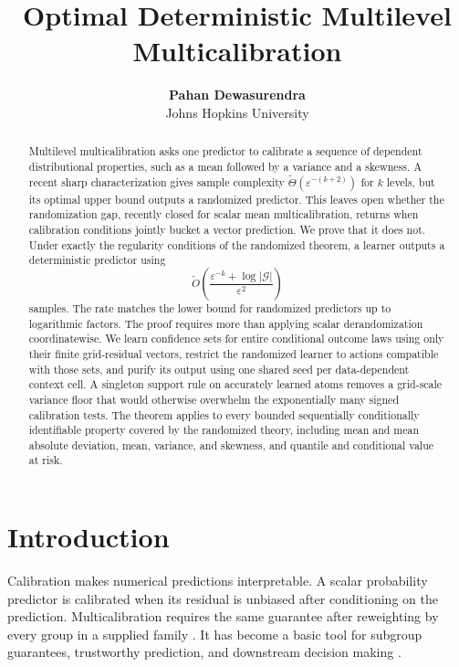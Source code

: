 \documentclass{article}
\title{Optimal Deterministic Multilevel Multicalibration}
\author{\textbf{Pahan Dewasurendra} \\ Johns Hopkins University}
\theoremstyle{definition}
\theoremstyle{remark}
\newcommand{\1}{\mathbf 1}
\begin{document}
\maketitle

\begin{abstract}
Multilevel multicalibration asks one predictor to calibrate a sequence of dependent distributional properties, such as a mean followed by a variance and a skewness. A recent sharp characterization gives sample complexity $\widetilde\Theta(\varepsilon^{-(k+2)})$ for $k$ levels, but its optimal upper bound outputs a randomized predictor. This leaves open whether the randomization gap, recently closed for scalar mean multicalibration, returns when calibration conditions jointly bucket a vector prediction. We prove that it does not. Under exactly the regularity conditions of the randomized theorem, a learner outputs a deterministic predictor using \[ \widetilde O\!\left(\frac{\varepsilon^{-k}+\log |\mathcal G|}{\varepsilon^2}\right) \] samples. The rate matches the lower bound for randomized predictors up to logarithmic factors. The proof requires more than applying scalar derandomization coordinatewise. We learn confidence sets for entire conditional outcome laws using only their finite grid-residual vectors, restrict the randomized learner to actions compatible with those sets, and purify its output using one shared seed per data-dependent context cell. A singleton support rule on accurately learned atoms removes a grid-scale variance floor that would otherwise overwhelm the exponentially many signed calibration tests. The theorem applies to every bounded sequentially conditionally identifiable property covered by the randomized theory, including mean and mean absolute deviation, mean, variance, and skewness, and quantile and conditional value at risk.
\end{abstract}

\section{Introduction}

Calibration makes numerical predictions interpretable. A scalar probability predictor is calibrated when its residual is unbiased after conditioning on the prediction. Multicalibration requires the same guarantee after reweighting by every group in a supplied family \citep{hebertjohnson2018multicalibration}. It has become a basic tool for subgroup guarantees, trustworthy prediction, and downstream decision making \citep{noarovroth2023scope,gopalan2022omnipredictors}.
\end{document}
